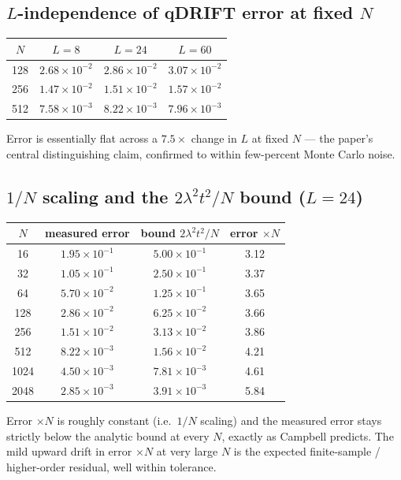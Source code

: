 \documentclass[11pt]{article}
\begin{document}
\subsection{$L$-independence of qDRIFT error at fixed $N$}
\begin{center}
\begin{tabular}{cccc}
\toprule
$N$ & $L=8$ & $L=24$ & $L=60$ \\
\midrule
128 & $2.68\!\times\!10^{-2}$ & $2.86\!\times\!10^{-2}$ & $3.07\!\times\!10^{-2}$ \\
256 & $1.47\!\times\!10^{-2}$ & $1.51\!\times\!10^{-2}$ & $1.57\!\times\!10^{-2}$ \\
512 & $7.58\!\times\!10^{-3}$ & $8.22\!\times\!10^{-3}$ & $7.96\!\times\!10^{-3}$ \\
\bottomrule
\end{tabular}
\end{center}
Error is essentially flat across a $7.5\times$ change in $L$ at fixed $N$ ---
the paper's central distinguishing claim, confirmed to within few-percent
Monte Carlo noise.

\subsection{$1/N$ scaling and the $2\lambda^{2}t^{2}/N$ bound ($L = 24$)}
\begin{center}
\begin{tabular}{cccc}
\toprule
$N$ & measured error & bound $2\lambda^{2}t^{2}/N$ & error $\times N$ \\
\midrule
16   & $1.95\!\times\!10^{-1}$ & $5.00\!\times\!10^{-1}$ & 3.12 \\
32   & $1.05\!\times\!10^{-1}$ & $2.50\!\times\!10^{-1}$ & 3.37 \\
64   & $5.70\!\times\!10^{-2}$ & $1.25\!\times\!10^{-1}$ & 3.65 \\
128  & $2.86\!\times\!10^{-2}$ & $6.25\!\times\!10^{-2}$ & 3.66 \\
256  & $1.51\!\times\!10^{-2}$ & $3.13\!\times\!10^{-2}$ & 3.86 \\
512  & $8.22\!\times\!10^{-3}$ & $1.56\!\times\!10^{-2}$ & 4.21 \\
1024 & $4.50\!\times\!10^{-3}$ & $7.81\!\times\!10^{-3}$ & 4.61 \\
2048 & $2.85\!\times\!10^{-3}$ & $3.91\!\times\!10^{-3}$ & 5.84 \\
\bottomrule
\end{tabular}
\end{center}
Error $\times N$ is roughly constant (i.e.\ $1/N$ scaling) and the measured
error stays strictly below the analytic bound at every $N$, exactly as
Campbell predicts. The mild upward drift in error $\times N$ at very large
$N$ is the expected finite-sample / higher-order residual, well within
tolerance.
\end{document}
